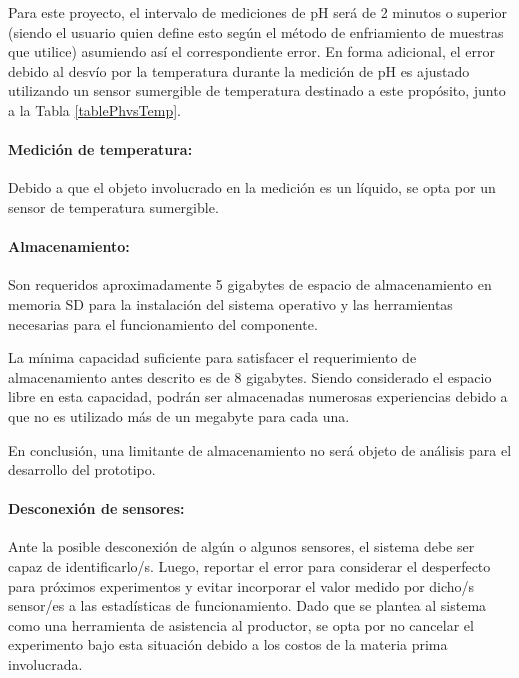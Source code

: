             \par Para este proyecto, el intervalo de mediciones de pH será de 2 minutos o superior (siendo el usuario quien define esto según el método de enfriamiento de muestras que utilice) asumiendo así el correspondiente error. En forma adicional, el error debido al desvío por la temperatura durante la medición de pH es ajustado utilizando un sensor sumergible de temperatura destinado a este propósito, junto a la Tabla \ref{tablePhvsTemp}.
        
        \paragraph{Medición de temperatura:} 
            Debido a que el objeto involucrado en la medición es un líquido, se opta por un sensor de temperatura sumergible.
        
            
        
        \paragraph{Almacenamiento:} 
             Son requeridos aproximadamente 5 gigabytes de espacio de almacenamiento en memoria SD para la instalación del sistema operativo y las herramientas necesarias para el funcionamiento del componente.
            
            \par La mínima capacidad suficiente para satisfacer el requerimiento de almacenamiento antes descrito es de 8 gigabytes. Siendo considerado el espacio libre en esta  capacidad, podrán ser almacenadas numerosas experiencias debido a que no es utilizado más de un megabyte para cada una.
            
            \par En conclusión, una limitante de almacenamiento no será objeto de análisis para el desarrollo del prototipo.
            
        \paragraph{Desconexión de sensores:} 
             Ante la posible desconexión de algún o algunos sensores, el sistema debe ser capaz de identificarlo/s. Luego, reportar el error para considerar el desperfecto para próximos experimentos y evitar incorporar el valor medido por dicho/s sensor/es a las estadísticas de funcionamiento. Dado que se plantea al sistema como una herramienta de asistencia al productor, se opta por no cancelar el experimento bajo esta situación debido a los costos de la materia prima involucrada.
            
